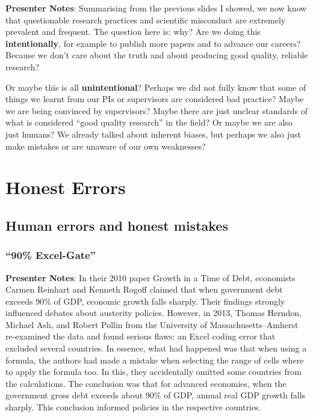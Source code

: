 \documentclass[
  letterpaper,
  DIV=11,
  numbers=noendperiod]{scrartcl}
\begin{document}
\textbf{Presenter Notes}: Summarising from the previous slides I showed,
we now know that questionable research practices and scientific
misconduct are extremely prevalent and frequent. The question here is:
why? Are we doing this \textbf{intentionally}, for example to publish
more papers and to advance our careers? Because we don't care about the
truth and about producing good quality, reliable research?

Or maybe this is all \textbf{unintentional}? Perhaps we did not fully
know that some of things we learnt from our PIs or supervisors are
considered bad practice? Maybe we are being convinced by supervisors?
Maybe there are just unclear standards of what is considered ``good
quality research'' in the field? Or maybe we are also just humans? We
already talked about inherent biases, but perhaps we also just make
mistakes or are unaware of our own weaknesses?

\section{Honest Errors}\label{honest-errors}

\subsection{Human errors and honest
mistakes}\label{human-errors-and-honest-mistakes}

\subsubsection{``90\% Excel-Gate''}\label{excel-gate}

\textbf{Presenter Notes}: In their 2010 paper Growth in a Time of Debt,
economists Carmen Reinhart and Kenneth Rogoff claimed that when
government debt exceeds 90\% of GDP, economic growth falls sharply.
Their findings strongly influenced debates about austerity policies.
However, in 2013, Thomas Herndon, Michael Ash, and Robert Pollin from
the University of Massachusetts--Amherst re-examined the data and found
serious flaws: an Excel coding error that excluded several countries. In
essence, what had happened was that when using a formula, the authors
had made a mistake when selecting the range of cells where to apply the
formula too. In this, they accidentally omitted some countries from the
calculations. The conclusion was that for advanced economies, when the
government gross debt exceeds about 90\% of GDP, annual real GDP growth
falls sharply. This conclusion informed policies in the respective
countries.
\end{document}
